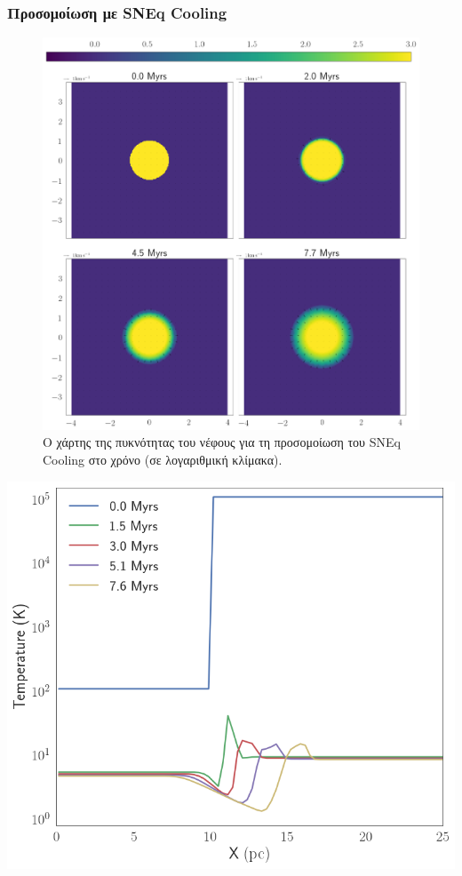 	
	
	\subsubsection{Προσομοίωση με SNEq Cooling}
	
			\begin{figure}
				\includegraphics[width=1\linewidth]{DataImages/SNCoolingRHOquad}
				\caption{Ο χάρτης της πυκνότητας του νέφους για τη προσομοίωση του SNEq Cooling στο χρόνο (σε λογαριθμική κλίμακα).}
				\label{fig:sncoolingrhoquad}
			\end{figure}
		
\begin{marginfigure}
	\centering
	\includegraphics[width=1\linewidth]{DataImages/SNCoolingTMPprofile}
	\caption{}
	\label{fig:sncoolingtmpprofile}
\end{marginfigure}

